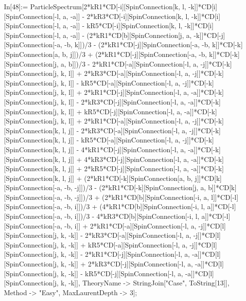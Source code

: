 In[48]:= ParticleSpectrum[2*kR1*CD[-i][SpinConnection[k, l, -k]]*CD[i][SpinConnection[-l, a, -a]] - 2*kR3*CD[-i][SpinConnection[k, l, -k]]*CD[i][SpinConnection[-l, a, -a]] - kR5*CD[-i][SpinConnection[k, l, -k]]*CD[i][SpinConnection[-l, a, -a]] - (2*kR1*CD[b][SpinConnection[j, a, -k]]*CD[-j][SpinConnection[-a, -b, k]])/3 - (2*kR1*CD[-j][SpinConnection[-a, -b, k]]*CD[-k][SpinConnection[a, b, j]])/3 + (2*kR1*CD[-j][SpinConnection[-a, -b, k]]*CD[-k][SpinConnection[j, a, b]])/3 - 2*kR1*CD[-a][SpinConnection[-l, a, -j]]*CD[-k][SpinConnection[j, k, l]] + 2*kR3*CD[-a][SpinConnection[-l, a, -j]]*CD[-k][SpinConnection[j, k, l]] - kR5*CD[-a][SpinConnection[-l, a, -j]]*CD[-k][SpinConnection[j, k, l]] + 2*kR1*CD[-j][SpinConnection[-l, a, -a]]*CD[-k][SpinConnection[j, k, l]] - 2*kR3*CD[-j][SpinConnection[-l, a, -a]]*CD[-k][SpinConnection[j, k, l]] + kR5*CD[-j][SpinConnection[-l, a, -a]]*CD[-k][SpinConnection[j, k, l]] + 2*kR1*CD[-a][SpinConnection[-l, a, -j]]*CD[-k][SpinConnection[k, l, j]] - 2*kR3*CD[-a][SpinConnection[-l, a, -j]]*CD[-k][SpinConnection[k, l, j]] - kR5*CD[-a][SpinConnection[-l, a, -j]]*CD[-k][SpinConnection[k, l, j]] - 4*kR1*CD[-j][SpinConnection[-l, a, -a]]*CD[-k][SpinConnection[k, l, j]] + 4*kR3*CD[-j][SpinConnection[-l, a, -a]]*CD[-k][SpinConnection[k, l, j]] + 2*kR5*CD[-j][SpinConnection[-l, a, -a]]*CD[-k][SpinConnection[k, l, j]] + (2*kR1*CD[-k][SpinConnection[a, b, j]]*CD[k][SpinConnection[-a, -b, -j]])/3 - (2*kR1*CD[-k][SpinConnection[j, a, b]]*CD[k][SpinConnection[-a, -b, -j]])/3 + (2*kR1*CD[b][SpinConnection[-i, a, l]]*CD[-l][SpinConnection[-a, -b, i]])/3 + (4*kR1*CD[b][SpinConnection[-i, l, a]]*CD[-l][SpinConnection[-a, -b, i]])/3 - 4*kR3*CD[b][SpinConnection[-i, l, a]]*CD[-l][SpinConnection[-a, -b, i]] + 2*kR1*CD[-a][SpinConnection[-l, a, -j]]*CD[l][SpinConnection[j, k, -k]] - 2*kR3*CD[-a][SpinConnection[-l, a, -j]]*CD[l][SpinConnection[j, k, -k]] + kR5*CD[-a][SpinConnection[-l, a, -j]]*CD[l][SpinConnection[j, k, -k]] - 2*kR1*CD[-j][SpinConnection[-l, a, -a]]*CD[l][SpinConnection[j, k, -k]] + 2*kR3*CD[-j][SpinConnection[-l, a, -a]]*CD[l][SpinConnection[j, k, -k]] - kR5*CD[-j][SpinConnection[-l, a, -a]]*CD[l][SpinConnection[j, k, -k]], TheoryName -> StringJoin["Case", ToString[13]], Method -> "Easy", MaxLaurentDepth -> 3]; 